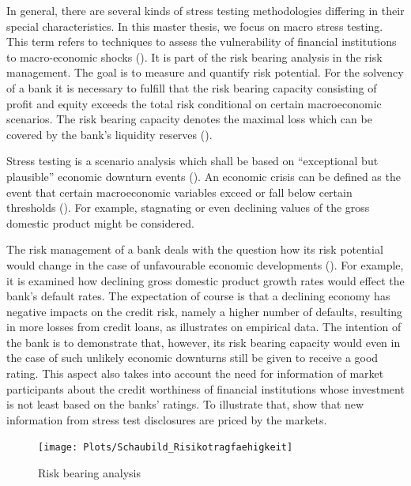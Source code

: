 \documentclass[a4paper, 12pt]{scrreprt}
\begin{document}
In general, there are several kinds of stress testing methodologies differing in their special characteristics. In this master thesis, we focus on macro stress testing.
This term refers to techniques to assess the vulnerability of financial institutions to macro-economic shocks (\textcite{imf2001stresstesting}).
It is part of the risk bearing analysis in the risk management. 
The goal is to measure and quantify risk potential. 
For the solvency of a bank it is necessary to fulfill that the risk bearing capacity consisting of profit and equity exceeds the total risk conditional on certain macroeconomic scenarios. The risk bearing capacity denotes the maximal loss which can be covered by the bank's liquidity reserves (\textcite{buba2017icaap}).

Stress testing is a scenario analysis which shall be based on ``exceptional but plausible'' \linebreak economic downturn events (\textcite[guideline 10]{ecb2010cebs}). 
An economic crisis can be defined as the event that certain macroeconomic variables exceed or fall below certain thresholds (\textcite[chapter 1]{bis2004sorge}).
For example, stagnating or even declining values of the gross domestic product might be considered. 

\bigskip 

The risk management of a bank deals with the question how its risk potential would change in the case of unfavourable economic developments (\textcite[MaRisk AT 4.3.3, note 3]{bafin2017marisk}).
For example, it is examined how declining gross domestic product growth rates would effect the bank's default rates. The expectation of course is that a declining economy has negative impacts on the credit risk, namely a higher number of defaults, resulting in more losses from credit loans, as \textcite[p. 112]{wilson1997wilsonI} illustrates on empirical data.
The intention of the bank is to demonstrate that, however, its risk bearing capacity would even in the case of such unlikely economic downturns still be given to receive a good rating. 
This aspect also takes into account the need for information of market participants about the credit worthiness of financial institutions whose investment is not least based on the banks' ratings. To illustrate that, \textcite[p. 5]{gross2017dostresstestsmatter} show that new information from stress test disclosures are priced by the markets.

\begin{figure}[H]
	\centering
	\texttt{[image: Plots/Schaubild\_Risikotragfaehigkeit]}
	\caption{Risk bearing analysis}
	\label{image:riskbearinganalysis}
\end{figure}
\end{document}
